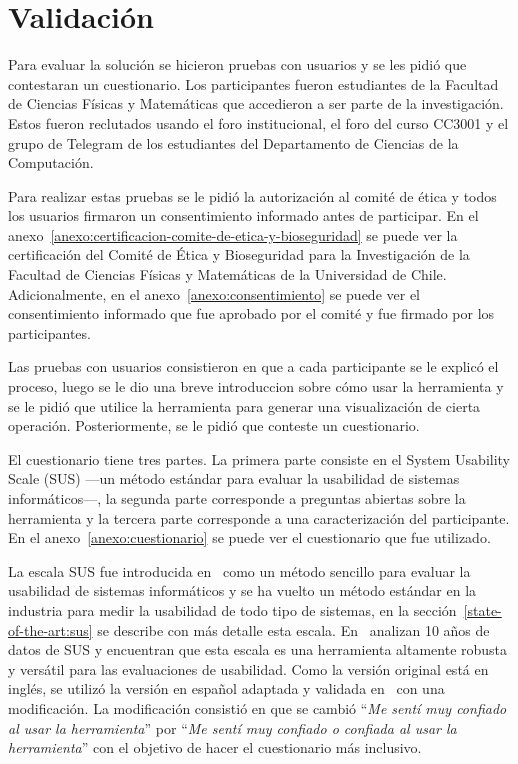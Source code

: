 \chapter{Validación}

Para evaluar la solución se hicieron pruebas con usuarios y se les pidió que contestaran un cuestionario. Los participantes fueron estudiantes de la Facultad de Ciencias Físicas y Matemáticas que accedieron a ser parte de la investigación. Estos fueron reclutados usando el foro institucional, el foro del curso CC3001 y el grupo de Telegram de los estudiantes del Departamento de Ciencias de la Computación.

Para realizar estas pruebas se le pidió la autorización al comité de ética y todos los usuarios firmaron un consentimiento informado antes de participar. En el anexo~\ref{anexo:certificacion-comite-de-etica-y-bioseguridad} se puede ver la certificación del Comité de Ética y Bioseguridad para la Investigación de la Facultad de Ciencias Físicas y Matemáticas de la Universidad de Chile. Adicionalmente, en el anexo~\ref{anexo:consentimiento} se puede ver el consentimiento informado que fue aprobado por el comité y fue firmado por los participantes.

Las pruebas con usuarios consistieron en que a cada participante se le explicó el proceso, luego se le dio una breve introduccion sobre cómo usar la herramienta y se le pidió que utilice la herramienta para generar una visualización de cierta operación. Posteriormente, se le pidió que conteste un cuestionario.

El cuestionario tiene tres partes. La primera parte consiste en el System Usability Scale (SUS) ---un método estándar para evaluar la usabilidad de sistemas informáticos---, la segunda parte corresponde a preguntas abiertas sobre la herramienta y la tercera parte corresponde a una caracterización del participante. En el anexo~\ref{anexo:cuestionario} se puede ver el cuestionario que fue utilizado.

La escala SUS fue introducida en~\cite{brooke1996quick} como un método sencillo para evaluar la usabilidad de sistemas informáticos y se ha vuelto un método estándar en la industria para medir la usabilidad de todo tipo de sistemas, en la sección~\ref{state-of-the-art:sus} se describe con más detalle esta escala. En~\cite{evaluation-of-sus} analizan 10 años de datos de SUS y encuentran que esta escala es una herramienta altamente robusta y versátil para las evaluaciones de usabilidad. Como la versión original está en inglés, se utilizó la versión en español adaptada y validada en~\cite{spanish-sus} con una modificación. La modificación consistió en que se cambió ``\textit{Me sentí muy confiado al usar la herramienta}'' por ``\textit{Me sentí muy confiado o confiada al usar la herramienta}'' con el objetivo de hacer el cuestionario más inclusivo.

